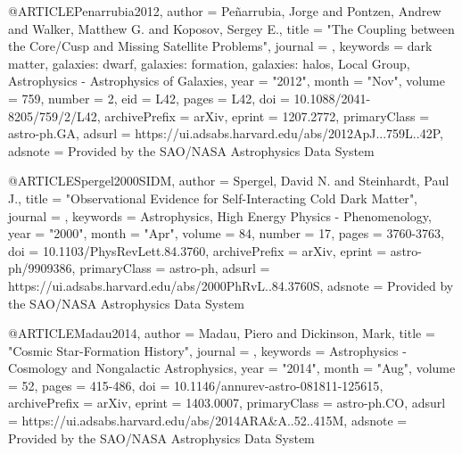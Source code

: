 \documentclass[apj]{emulateapj}
\begin{document}
{{{{@ARTICLE{Penarrubia2012,
       author = {{Pe{\~n}arrubia}, Jorge and {Pontzen}, Andrew and {Walker}, Matthew G. and
         {Koposov}, Sergey E.},
        title = "{The Coupling between the Core/Cusp and Missing Satellite Problems}",
      journal = {\apj},
     keywords = {dark matter, galaxies: dwarf, galaxies: formation, galaxies: halos, Local Group, Astrophysics - Astrophysics of Galaxies},
         year = "2012",
        month = "Nov",
       volume = {759},
       number = {2},
          eid = {L42},
        pages = {L42},
          doi = {10.1088/2041-8205/759/2/L42},
archivePrefix = {arXiv},
       eprint = {1207.2772},
 primaryClass = {astro-ph.GA},
       adsurl = {https://ui.adsabs.harvard.edu/abs/2012ApJ...759L..42P},
      adsnote = {Provided by the SAO/NASA Astrophysics Data System}
}


@ARTICLE{Spergel2000SIDM,
       author = {{Spergel}, David N. and {Steinhardt}, Paul J.},
        title = "{Observational Evidence for Self-Interacting Cold Dark Matter}",
      journal = {\prl},
     keywords = {Astrophysics, High Energy Physics - Phenomenology},
         year = "2000",
        month = "Apr",
       volume = {84},
       number = {17},
        pages = {3760-3763},
          doi = {10.1103/PhysRevLett.84.3760},
archivePrefix = {arXiv},
       eprint = {astro-ph/9909386},
 primaryClass = {astro-ph},
       adsurl = {https://ui.adsabs.harvard.edu/abs/2000PhRvL..84.3760S},
      adsnote = {Provided by the SAO/NASA Astrophysics Data System}
}




@ARTICLE{Madau2014,
       author = {{Madau}, Piero and {Dickinson}, Mark},
        title = "{Cosmic Star-Formation History}",
      journal = {\araa},
     keywords = {Astrophysics - Cosmology and Nongalactic Astrophysics},
         year = "2014",
        month = "Aug",
       volume = {52},
        pages = {415-486},
          doi = {10.1146/annurev-astro-081811-125615},
archivePrefix = {arXiv},
       eprint = {1403.0007},
 primaryClass = {astro-ph.CO},
       adsurl = {https://ui.adsabs.harvard.edu/abs/2014ARA&A..52..415M},
      adsnote = {Provided by the SAO/NASA Astrophysics Data System}
}



}}}}
\end{document}
